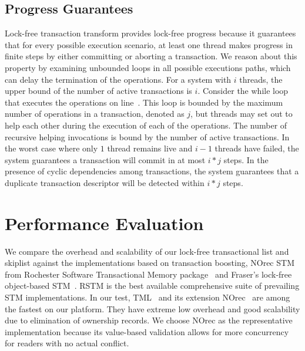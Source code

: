 \documentclass{sig-alternate-05-2015}
\begin{document}
\subsection{Progress Guarantees}
Lock-free transaction transform provides lock-free progress because it guarantees that for every possible execution scenario, at least one thread makes progress in finite steps by either committing or aborting a transaction.  
We reason about this property by examining unbounded loops in all possible executions paths, which can delay the termination of the operations.
For a system with $i$ threads, the upper bound of the number of active transactions is $i$.
Consider the while loop that executes the operations on line~.
This loop is bounded by the maximum number of operations in a transaction, denoted as $j$, but threads may set out to help each other during the execution of each of the operations.
The number of recursive helping invocations is bound by the number of active transactions. 
In the worst case where only $1$ thread remains live and $i-1$ threads have failed, the system guarantees a transaction will commit in at most $i * j$ steps.
In the presence of cyclic dependencies among transactions, the system guarantees that a duplicate transaction descriptor will be detected within $i * j$ steps.

\section{Performance Evaluation}
\label{sec:experiment}
We compare the overhead and scalability of our lock-free transactional list and skiplist against the implementations based on transaction boosting, NOrec STM from Rochester Software Transactional Memory package~\cite{marathe2006lowering} and Fraser's lock-free object-based STM~\cite{fraser2004practical}.
RSTM is the best available comprehensive suite of prevailing STM implementations.
In our test, TML~\cite{dalessandro2010norec} and its extension NOrec~\cite{dalessandro2010norec} are among the fastest on our platform.
They have extreme low overhead and good scalability due to elimination of ownership records.
We choose NOrec as the representative implementation because its value-based validation allows for more concurrency for readers with no actual conflict.
\end{document}

